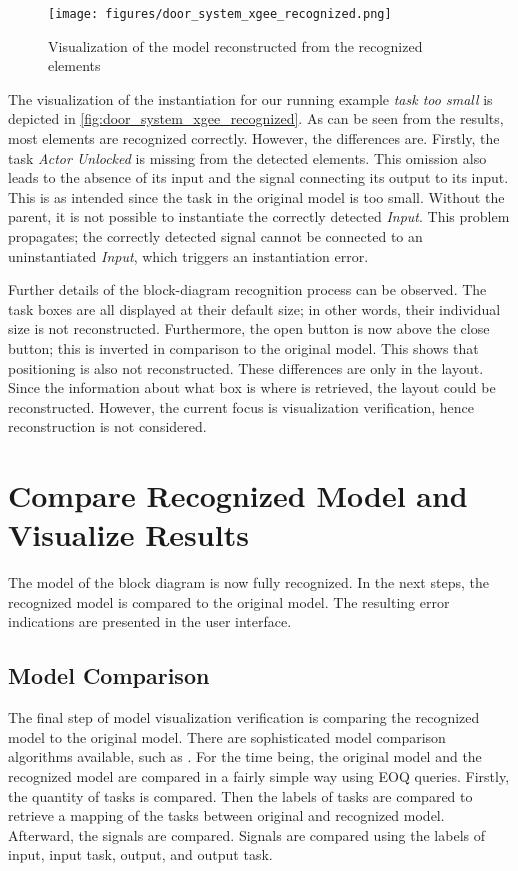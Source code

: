 \begin{figure}[htb]
  \centering
  \texttt{[image: figures/door\_system\_xgee\_recognized.png]}
  \caption{Visualization of the model reconstructed from the recognized elements}
  
  \label{fig:door_system_xgee_recognized}
\end{figure}

The visualization of the instantiation for our running example \emph{task too small} is depicted in \autoref{fig:door_system_xgee_recognized}. As can be seen from the results, most elements are recognized correctly. However, the differences are.
Firstly, the task \emph{Actor Unlocked} is missing from the detected elements. This omission also leads to the absence of its input and the signal connecting its output to its input. This is as intended since the task in the original model is too small. Without the parent, it is not possible to instantiate the correctly detected \emph{Input}. This problem propagates; the correctly detected signal cannot be connected to an uninstantiated \emph{Input}, which triggers an instantiation error. 

Further details of the block-diagram recognition process can be observed. The task boxes are all displayed at their default size; in other words, their individual size is not reconstructed. Furthermore, the open button is now above the close button; this is inverted in comparison to the original model. This shows that positioning is also not reconstructed. 
These differences are only in the layout. Since the information about what box is where is retrieved, the layout could be reconstructed. However, the current focus is visualization verification, hence reconstruction is not considered. 

\section{Compare Recognized Model and Visualize Results}
The model of the block diagram is now fully recognized. In the next steps, the recognized model is compared to the original model. The resulting error indications are presented in the user interface. 


\subsection{Model Comparison}
The final step of model visualization verification is comparing the recognized model to the original model. There are sophisticated model comparison algorithms available, such as \cite{Brun2008}. For the time being, the original model and the recognized model are compared in a fairly simple way using EOQ queries. 
Firstly, the quantity of tasks is compared. Then the labels of tasks are compared to retrieve a mapping of the tasks between original and recognized model. 
Afterward, the signals are compared. Signals are compared using the labels of input, input task, output, and output task.

